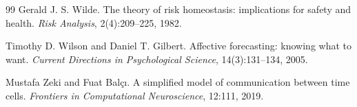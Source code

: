 \documentclass[11pt,a4paper]{article}
\theoremstyle{remark}
\begin{document}
\begin{thebibliography}{99}
Gerald J. S. Wilde.
\newblock The theory of risk homeostasis: implications for safety and health.
\newblock \emph{Risk Analysis}, 2(4):209--225, 1982.

Timothy D. Wilson and Daniel T. Gilbert.
\newblock Affective forecasting: knowing what to want.
\newblock \emph{Current Directions in Psychological Science}, 14(3):131--134, 2005.

Mustafa Zeki and Fuat Bal\c{c}\i.
\newblock A simplified model of communication between time cells.
\newblock \emph{Frontiers in Computational Neuroscience}, 12:111, 2019.
\end{thebibliography}
\end{document}
